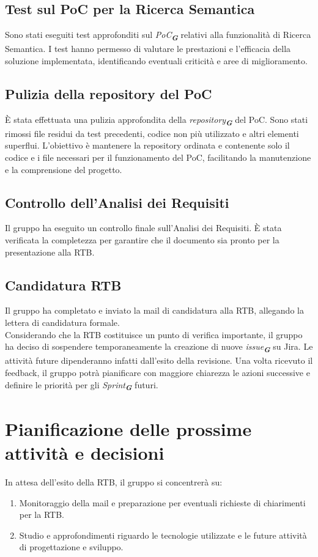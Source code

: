 \documentclass[a4paper,12pt]{article}
\newcommand{\glossario}[1]{\textit{#1}\textsubscript{\textbf{\textit{\textcolor{lightblack}{G}}}}}
\begin{document}
\subsection{Test sul PoC per la Ricerca Semantica}
Sono stati eseguiti test approfonditi sul \glossario{PoC} relativi alla funzionalità di Ricerca Semantica. I test hanno permesso di valutare le prestazioni e l'efficacia della soluzione implementata, identificando eventuali criticità e aree di miglioramento.\\

\subsection{Pulizia della repository del PoC}
È stata effettuata una pulizia approfondita della \glossario{repository} del PoC. Sono stati rimossi file residui da test precedenti, codice non più utilizzato e altri elementi superflui. L'obiettivo è mantenere la repository ordinata e contenente solo il codice e i file necessari per il funzionamento del PoC, facilitando la manutenzione e la comprensione del progetto.\\

\subsection{Controllo dell'Analisi dei Requisiti}
Il gruppo ha eseguito un controllo finale sull'Analisi dei Requisiti. È stata verificata la completezza per garantire che il documento sia pronto per la presentazione alla RTB.\\

\subsection{Candidatura RTB}
Il gruppo ha completato e inviato la mail di candidatura alla RTB, allegando la lettera di candidatura formale.\\
Considerando che la RTB costituisce un punto di verifica importante, il gruppo ha deciso di sospendere temporaneamente la creazione di nuove \glossario{issue} su Jira. Le attività future dipenderanno infatti dall'esito della revisione. Una volta ricevuto il feedback, il gruppo potrà pianificare con maggiore chiarezza le azioni successive e definire le priorità per gli \glossario{Sprint} futuri.\\


\section{Pianificazione delle prossime attività e decisioni}
In attesa dell'esito della RTB, il gruppo si concentrerà su:
\begin{enumerate}[noitemsep]
    \item Monitoraggio della mail e preparazione per eventuali richieste di chiarimenti per la RTB.
    \item Studio e approfondimenti riguardo le tecnologie utilizzate e le future attività di progettazione e sviluppo.
\end{enumerate}
\end{document}

